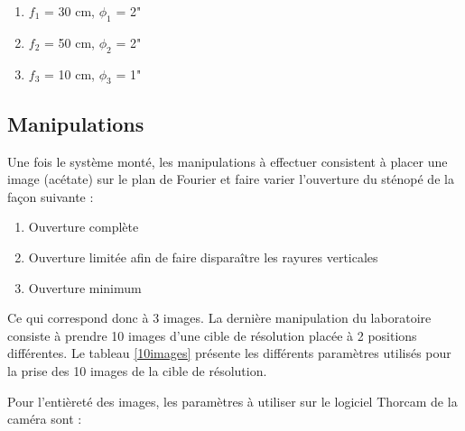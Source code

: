 \documentclass[11pt,letterpaper]{article}
\begin{document}
\begin{enumerate}
    \item $f_1$ = 30 cm, $\phi_1$ = 2" \\
    \item $f_2$ = 50 cm, $\phi_2$ = 2" \\
    \item $f_3$ = 10 cm, $\phi_3$ = 1" \\
\end{enumerate}

\subsection{Manipulations}

Une fois le système monté, les manipulations à effectuer consistent à placer une image (acétate) sur le plan de Fourier et faire varier l'ouverture du sténopé de la façon suivante : 

\begin{enumerate}
    \item Ouverture complète \\
    \item Ouverture limitée afin de faire disparaître les rayures verticales \\
    \item Ouverture minimum \\
\end{enumerate}

Ce qui correspond donc à 3 images. La dernière manipulation du laboratoire consiste à prendre 10 images d'une cible de résolution placée à 2 positions différentes. Le tableau \ref{10images} présente les différents paramètres utilisés pour la prise des 10 images de la cible de résolution. 

\begin{table}[h!]
\centering
{}
\caption{Tableau des paramètres utilisés pour la prise des 10 images}
\label{10images}
\end{table}

Pour l'entièreté des images, les paramètres à utiliser sur le logiciel Thorcam de la caméra sont : 
\end{document}
